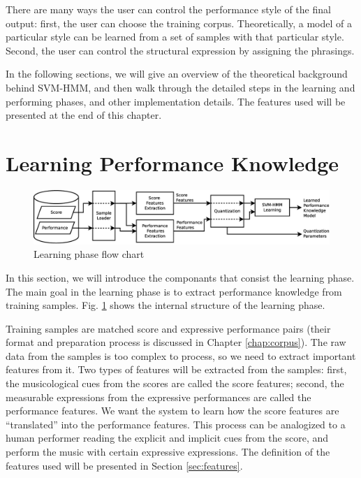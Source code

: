 There are many ways the user can control the performance style of the final output: first, the user can choose the training corpus. Theoretically, a model of a particular style can be learned from a set of samples with that particular style. Second, the user can control the structural expression by assigning the phrasings.


In the following sections, we will give an overview of the theoretical background behind SVM-HMM, and then walk through the detailed steps in the learning and performing phases, and other implementation details. The features used will be presented at the end of this chapter.



\section{Learning Performance Knowledge}
\label{sec:learn}
\begin{figure}[tp]
   \begin{center}
      \includegraphics[width=\textwidth]{fig/learn_arch}
   \end{center}
   \caption{Learning phase flow chart} 
   \label{fig:learnflow}
\end{figure}
In this section, we will introduce the componants that consist the learning phase.
The main goal in the learning phase is to extract performance knowledge from training samples. Fig. \ref{fig:learnflow} shows the internal structure of the learning phase.

Training samples are matched score and expressive performance pairs (their format and preparation process is discussed in Chapter \ref{chap:corpus}). The raw data from the samples is too complex to process, so we need to extract important features from it. Two types of features will be extracted from the samples: first, the musicological cues from the scores are called the score features; second, the measurable expressions from the expressive performances are called the performance features. We want the system to learn how the score features are \enquote{translated} into the performance features. This process can be analogized to a human performer reading the explicit and implicit cues from the score, and perform the music with certain expressive expressions. The definition of the features used will be presented in Section \ref{sec:features}.


